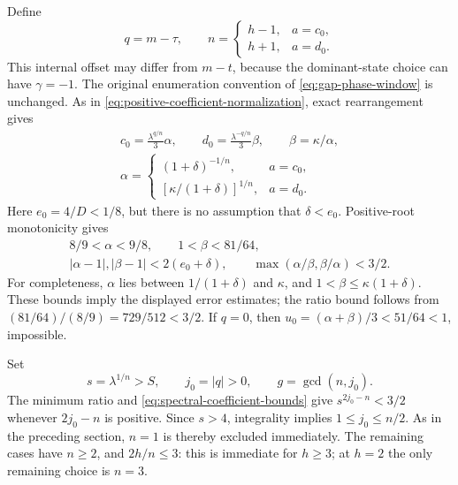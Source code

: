 Define
\begin{equation}\label{eq:spectral-phase-normalization}
 q=m-\tau,\qquad
 n=\begin{cases}h-1,&a=c_0,\\h+1,&a=d_0.
 \end{cases}
\end{equation}
This internal offset may differ from $m-t$, because the dominant-state
choice can have $\gamma=-1$. The original enumeration convention of
\eqref{eq:gap-phase-window} is unchanged.
As in \eqref{eq:positive-coefficient-normalization}, exact rearrangement
gives
\begin{equation}\label{eq:spectral-coefficient-normalization}
 \begin{gathered}
 c_0=\frac{\lambda^{q/n}}3\alpha,\qquad
 d_0=\frac{\lambda^{-q/n}}3\beta,\qquad \beta=\kappa/\alpha,\\
 \alpha=\begin{cases}
 (1+\delta)^{-1/n},&a=c_0,\\
 [\kappa/(1+\delta)]^{1/n},&a=d_0.
 \end{cases}
 \end{gathered}
\end{equation}
Here $e_0=4/D<1/8$, but there is no assumption that $\delta<e_0$.
Positive-root monotonicity gives
\begin{equation}\label{eq:spectral-coefficient-bounds}
 \begin{gathered}
 8/9<\alpha<9/8,\qquad 1<\beta<81/64,\\
 |\alpha-1|,|\beta-1|<2(e_0+\delta),\qquad
 \max(\alpha/\beta,\beta/\alpha)<3/2.
 \end{gathered}
\end{equation}
For completeness, $\alpha$ lies between $1/(1+\delta)$ and $\kappa$,
and $1<\beta\leqslant\kappa(1+\delta)$. These bounds imply the
displayed error estimates; the ratio bound follows from
$(81/64)/(8/9)=729/512<3/2$.
If $q=0$, then $u_0=(\alpha+\beta)/3<51/64<1$, impossible.

Set
\begin{equation}\label{eq:spectral-gcd-scale}
 s=\lambda^{1/n}>S,\qquad j_0=|q|>0,
 \qquad g=\gcd(n,j_0).
\end{equation}
The minimum ratio and \eqref{eq:spectral-coefficient-bounds} give
$s^{2j_0-n}<3/2$ whenever $2j_0-n$ is positive. Since $s>4$,
integrality implies $1\leqslant j_0\leqslant n/2$.
As in the preceding section, $n=1$ is thereby excluded immediately.
The remaining cases have $n\geqslant2$, and
$2h/n\leqslant3$: this is immediate for $h\geqslant3$; at $h=2$
the only remaining choice is $n=3$.

